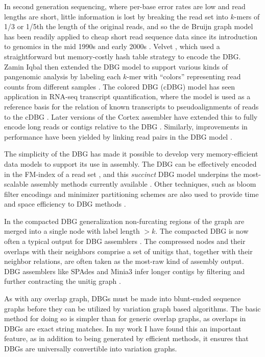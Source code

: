 In second generation sequencing, where per-base error rates are low and read lengths are short, little information is lost by breaking the read set into $k$-mers of 1/3 or 1/5th the length of the original reads, and so the de Bruijn graph model has been readily applied to cheap short read sequence data since its introduction to genomics in the mid 1990s and early 2000s \cite{idury1995new,pevzner2001eulerian}.
Velvet \cite{zerbino2008velvet}, which used a straightforward but memory-costly hash table strategy to encode the DBG.
Zamin Iqbal then extended the DBG model to support various kinds of pangenomic analysis by labeling each $k$-mer with ``colors'' representing read counts from different samples \cite{iqbal2012novo}.
The colored DBG (cDBG) model has seen application in RNA-seq transcript quantification, where the model is used as a reference basis for the relation of known transcripts to pseudoalignments of reads to the cDBG \cite{bray2016near}.
Later versions of the Cortex assembler have extended this to fully encode long reads or contigs relative to the DBG \cite{turner2018integrating}.
Similarly, improvements in performance have been yielded by linking read pairs in the DBG model \cite{bankevich2012spades}.

The simplicity of the DBG has made it possible to develop very memory-efficient data models to support its use in assembly.
The DBG can be effectively encoded in the FM-index of a read set \cite{bowe2012succinct}, and this \emph{succinct} DBG model underpins the most-scalable assembly methods currently available \cite{li2015megahit}.
Other techniques, such as bloom filter encodings and minimizer partitioning schemes are also used to provide time and space efficiency to DBG methods \cite{chikhi2013space, chikhi2016compacting}.

In the compacted DBG generalization non-furcating regions of the graph are merged into a single node with label length $>k$.
The compacted DBG is now often a typical output for DBG assemblers \cite{chikhi2016compacting,minkin2016twopaco}.
The compressed nodes and their overlaps with their neighbors comprise a set of unitigs that, together with their neighbor relations, are often taken as the most-raw kind of assembly output.
DBG assemblers like SPAdes and Minia3 infer longer contigs by filtering and further contracting the unitig graph \cite{bankevich2012spades}.

As with any overlap graph, DBGs must be made into blunt-ended sequence graphs before they can be utilized by variation graph based algorithms.
The basic method for doing so is simpler than for generic overlap graphs, as overlaps in DBGs are exact string matches.
In my work I have found this an important feature, as in addition to being generated by efficient methods, it ensures that DBGs are universally convertible into variation graphs.

